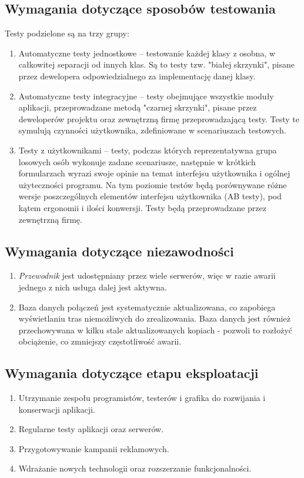 \documentclass[12pt,a4paper]{report}
\begin{document}
\subsection{Wymagania dotyczące sposobów testowania}
Testy podzielone są na trzy grupy:
\begin{enumerate}
	\item Automatyczne testy jednostkowe -- testowanie każdej klasy z osobna, w całkowitej separacji od innych klas. Są to testy tzw. "białej skrzynki", pisane przez dewelopera odpowiedzialnego za implementację danej klasy.
	\item Automatyczne testy integracyjne -- testy obejmujące wszystkie moduły aplikacji, przeprowadzane metodą "czarnej skrzynki", pisane przez deweloperów projektu oraz zewnętrzną firmę przeprowadzającą testy. Testy te symulują czynności użytkownika, zdefiniowane w scenariuszach testowych.
	\item Testy z użytkownikami -- testy, podczas których reprezentatywna grupa losowych osób wykonuje zadane scenariusze, następnie w krótkich formularzach wyrazi swoje opinie na temat interfejsu użytkownika i ogólnej użyteczności programu. Na tym poziomie testów będą porównywane różne wersje poszczególnych elementów interfejsu użytkownika (AB testy), pod kątem ergonomii i ilości konwersji. Testy będą przeprowadzane przez zewnętrzną firmę.
\end{enumerate}
\subsection{Wymagania dotyczące niezawodności}
\begin{enumerate}
	\item \emph{Przewodnik} jest udostępniany przez wiele serwerów, więc w razie awarii jednego z nich usługa dalej jest aktywna.
	\item Baza danych połączeń jest systematycznie aktualizowana, co zapobiega wyświetlaniu tras niemożliwych do zrealizowania. Baza danych jest również przechowywana w kilku stale aktualizowanych kopiach - pozwoli to rozłożyć obciążenie, co zmniejszy częstotliwość awarii.
\end{enumerate}
\subsection{Wymagania dotyczące etapu eksploatacji}
\begin{enumerate}
	\item Utrzymanie zespołu programistów, testerów i grafika do rozwijania i konserwacji aplikacji.
	\item Regularne testy aplikacji oraz serwerów.
	\item Przygotowywanie kampanii reklamowych.
	\item Wdrażanie nowych technologii oraz rozszerzanie funkcjonalności.
\end{enumerate}	
\end{document}
